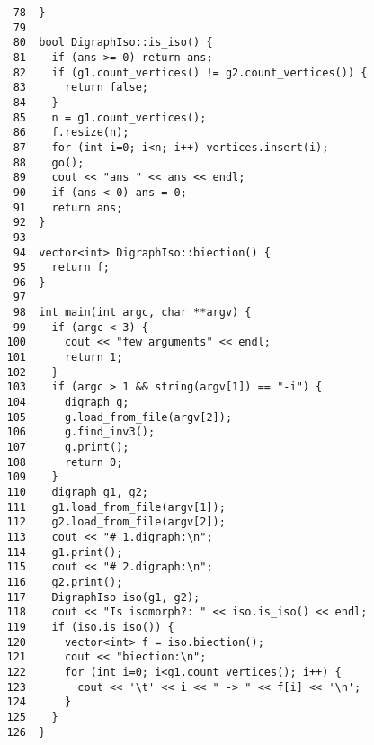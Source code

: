 \begin{verbatim}
    78	}
    79	
    80	bool DigraphIso::is_iso() {
    81	  if (ans >= 0) return ans;
    82	  if (g1.count_vertices() != g2.count_vertices()) {
    83	    return false;
    84	  }
    85	  n = g1.count_vertices();
    86	  f.resize(n);
    87	  for (int i=0; i<n; i++) vertices.insert(i);
    88	  go();
    89	  cout << "ans " << ans << endl;
    90	  if (ans < 0) ans = 0;
    91	  return ans;
    92	}
    93	
    94	vector<int> DigraphIso::biection() {
    95	  return f;
    96	}
    97	
    98	int main(int argc, char **argv) {
    99	  if (argc < 3) {
   100	    cout << "few arguments" << endl;
   101	    return 1;
   102	  }
   103	  if (argc > 1 && string(argv[1]) == "-i") {
   104	    digraph g;
   105	    g.load_from_file(argv[2]);
   106	    g.find_inv3();
   107	    g.print();
   108	    return 0;
   109	  }
   110	  digraph g1, g2;
   111	  g1.load_from_file(argv[1]);
   112	  g2.load_from_file(argv[2]);
   113	  cout << "# 1.digraph:\n";
   114	  g1.print();
   115	  cout << "# 2.digraph:\n";
   116	  g2.print();
   117	  DigraphIso iso(g1, g2);
   118	  cout << "Is isomorph?: " << iso.is_iso() << endl;
   119	  if (iso.is_iso()) {
   120	    vector<int> f = iso.biection();
   121	    cout << "biection:\n";
   122	    for (int i=0; i<g1.count_vertices(); i++) {
   123	      cout << '\t' << i << " -> " << f[i] << '\n';
   124	    }
   125	  }
   126	}
\end{verbatim}
